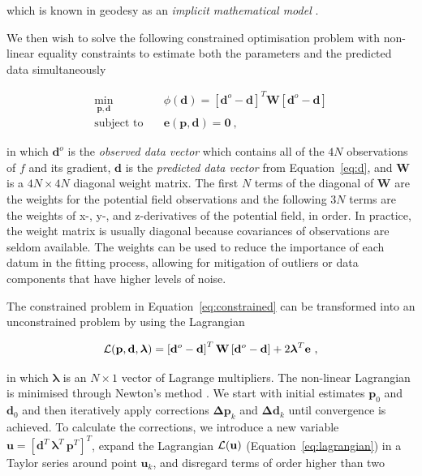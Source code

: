 \noindent
which is known in geodesy as an \textit{implicit mathematical model}
\citep{Vanicek1986}.

We then wish to solve the following constrained optimisation problem with
non-linear equality constraints to estimate both the parameters and the
predicted data simultaneously

\begin{equation}
  \begin{aligned}
    \min_{\mathbf{p}, \mathbf{d}} \quad &
      \phi(\mathbf{d}) =
      \left[\mathbf{d}^o - \mathbf{d}\right]^T \mathbf{W}
      \left[\mathbf{d}^o - \mathbf{d}\right]
    \\
    \textrm{subject to} \quad &
      \mathbf{e}(\mathbf{p}, \mathbf{d}) = \mathbf{0}
    \ ,
  \end{aligned}
  \label{eq:constrained}
\end{equation}

\noindent
in which $\mathbf{d}^o$ is the \textit{observed data vector} which contains all
of the $4N$ observations of $f$ and its gradient,
$\mathbf{d}$ is the \textit{predicted data vector} from Equation~\ref{eq:d},
and $\mathbf{W}$ is a $4N \times 4N$ diagonal weight matrix.
The first $N$ terms of the diagonal of $\mathbf{W}$ are the weights for the
potential field observations and the following $3N$ terms are the weights of
x-, y-, and z-derivatives of the potential field, in order.
In practice, the weight matrix is usually diagonal because covariances of
observations are seldom available.
The weights can be used to reduce the importance of each datum in the
fitting process, allowing for mitigation of outliers or data components that
have higher levels of noise.

The constrained problem in Equation~\ref{eq:constrained} can be transformed
into an unconstrained problem by using the Lagrangian

\begin{equation}
  \operatorname{\mathcal{L}}(\mathbf{p}, \mathbf{d}, \boldsymbol{\lambda}) =
    \left[\mathbf{d}^o - \mathbf{d}\right]^T \mathbf{W}
    \left[\mathbf{d}^o - \mathbf{d}\right]
    +
    2 \boldsymbol{\lambda}^T \mathbf{e}
  \ ,
  \label{eq:lagrangian}
\end{equation}

\noindent
in which $\boldsymbol{\lambda}$ is an $N \times 1$ vector of Lagrange
multipliers.
The non-linear Lagrangian is minimised through Newton's method
\citep{Aster2018}.
We start with initial estimates $\mathbf{p}_0$ and $\mathbf{d}_0$ and then
iteratively apply corrections $\mathbf{\Delta p}_k$ and $\mathbf{\Delta d}_k$
until convergence is achieved.
To calculate the corrections, we introduce a new variable $\mathbf{u} =
[\mathbf{d}^T\  \boldsymbol{\lambda}^T \ \mathbf{p}^T]^T$, expand the
Lagrangian $\operatorname{\mathcal{L}}(\mathbf{u})$ (Equation~\ref{eq:lagrangian}) in a Taylor
series around point $\mathbf{u}_k$, and disregard terms of order higher than
two

